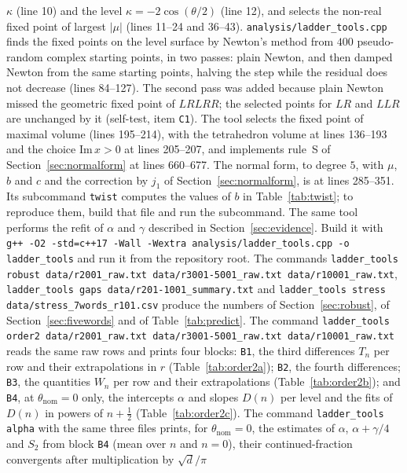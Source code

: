 \documentclass[11pt]{amsart}
\theoremstyle{definition}
\theoremstyle{remark}
\begin{document}
\begin{description}
$\kappa$ (line 10) and the level $\kappa = -2\cos(\theta/2)$ (line 12), and selects
the non-real fixed point of largest $|\mu|$ (lines 11--24 and 36--43).
\texttt{analysis/ladder\_tools.cpp} finds the fixed points on the level surface by
Newton's method from $400$ pseudo-random complex starting points, in two passes: plain
Newton, and then damped Newton from the same starting points, halving the step while
the residual does not decrease (lines 84--127). The second pass was added because
plain Newton missed the geometric fixed point of $LRLRR$; the selected points for $LR$
and $LLR$ are unchanged by it (self-test, item \texttt{C1}). The tool selects the
fixed point of maximal volume (lines 195--214), with the tetrahedron volume at lines
136--193 and the choice $\mathrm{Im}\,x > 0$ at lines 205--207, and implements rule~S
of Section~\ref{sec:normalform} at lines 660--677. The normal form, to degree $5$,
with $\mu$, $b$ and $c$ and the correction by $j_1$ of Section~\ref{sec:normalform}, is
at lines 285--351. Its subcommand \texttt{twist}
computes the values of $b$ in Table~\ref{tab:twist}; to reproduce them, build that
file and run the subcommand. The same tool performs the refit of $\alpha$ and $\gamma$
described in Section~\ref{sec:evidence}. Build it with \texttt{g++ -O2 -std=c++17
-Wall -Wextra analysis/ladder\_tools.cpp -o ladder\_tools} and run it from the
repository root. The commands \texttt{ladder\_tools robust data/r2001\_raw.txt
data/r3001-5001\_raw.txt data/r10001\_raw.txt}, \texttt{ladder\_tools gaps
data/r201-1001\_summary.txt} and \texttt{ladder\_tools stress
data/stress\_7words\_r101.csv} produce the numbers of Section~\ref{sec:robust}, of
Section~\ref{sec:fivewords} and of Table~\ref{tab:predict}. The command
\texttt{ladder\_tools order2 data/r2001\_raw.txt data/r3001-5001\_raw.txt
data/r10001\_raw.txt} reads the same raw rows and prints four blocks: \texttt{B1}, the
third differences $T_n$ per row and their extrapolations in $r$
(Table~\ref{tab:order2a}); \texttt{B2}, the fourth differences; \texttt{B3}, the
quantities $W_n$ per row and their extrapolations (Table~\ref{tab:order2b}); and
\texttt{B4}, at $\theta_{\mathrm{nom}} = 0$ only, the intercepts $\alpha$ and slopes
$D(n)$ per level and the fits of $D(n)$ in powers of $n + \frac12$
(Table~\ref{tab:order2c}). The command \texttt{ladder\_tools alpha} with the same three
files prints, for $\theta_{\mathrm{nom}} = 0$, the estimates of $\alpha$, $\alpha +
\gamma/4$ and $S_2$ from block \texttt{B4} (mean over $n$ and $n = 0$), their
continued-fraction convergents after multiplication by $\sqrt d/\pi$

\end{description}
\end{document}
